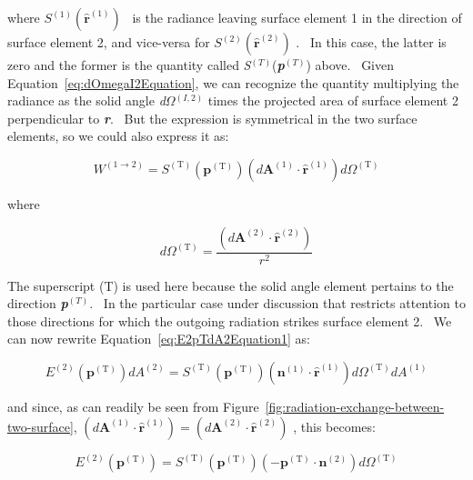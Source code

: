 where \({S^{{\mathrm{(1)}}}}({{\mathbf{\hat r}}^{{\mathrm{(1)}}}})\) ~is the radiance leaving surface element 1 in the direction of surface element 2, and vice-versa for \({S^{{\mathrm{(2)}}}}({{\mathbf{\hat r}}^{{\mathrm{(2)}}}})\) .~ In this case, the latter is zero and the former is the quantity called \emph{S}\(^{(T)}\)(\textbf{\emph{p}}\(^{(T)}\)) above.~ Given Equation~\ref{eq:dOmegaI2Equation}, we can recognize the quantity multiplying the radiance as the solid angle \emph{d}\(\Omega\)\(^{(I,2)}\) times the projected area of surface element 2 perpendicular to \textbf{\emph{r}}.~ But the expression is symmetrical in the two surface elements, so we could also express it as:

\begin{equation}
{W^{(1 \to 2)}} = {S^{{\mathrm{(T)}}}}({{\mathbf{p}}^{{\mathrm{(T)}}}})\left( {d{{\mathbf{A}}^{{\mathrm{(1)}}}} \cdot {{{\mathbf{\hat r}}}^{{\mathrm{(1)}}}}} \right)d{\Omega ^{{\mathrm{(T)}}}}
\end{equation}

where

\begin{equation}
d{\Omega ^{{\mathrm{(T)}}}} = \frac{{\left( {d{{\mathbf{A}}^{{\mathrm{(2)}}}} \cdot {{{\mathbf{\hat r}}}^{{\mathrm{(2)}}}}} \right)}}{{{r^2}}}
\end{equation}

The superscript (T) is used here because the solid angle element pertains to the direction \textbf{\emph{p}}\(^{(T)}\).~ In the particular case under discussion that restricts attention to those directions for which the outgoing radiation strikes surface element 2.~ We can now rewrite Equation~\ref{eq:E2pTdA2Equation1} as:

\begin{equation}
{E^{{\mathrm{(2)}}}}({{\mathbf{p}}^{{\mathrm{(T)}}}})d{A^{{\mathrm{(2)}}}} = {S^{{\mathrm{(T)}}}}({{\mathbf{p}}^{{\mathrm{(T)}}}})\left( {{{\mathbf{n}}^{{\mathrm{(1)}}}} \cdot {{{\mathbf{\hat r}}}^{{\mathrm{(1)}}}}} \right)d{\Omega ^{{\mathrm{(T)}}}}d{A^{{\mathrm{(1)}}}}
\label{eq:E2pTdA2Equation}
\end{equation}

and since, as can readily be seen from Figure~\ref{fig:radiation-exchange-between-two-surface}, \(\left( {d{{\mathbf{A}}^{{\mathrm{(1)}}}} \cdot {{{\mathbf{\hat r}}}^{{\mathrm{(1)}}}}} \right) = \left( {d{{\mathbf{A}}^{{\mathrm{(2)}}}} \cdot {{{\mathbf{\hat r}}}^{{\mathrm{(2)}}}}} \right)\) , this becomes:

\begin{equation}
{E^{{\mathrm{(2)}}}}({{\mathbf{p}}^{{\mathrm{(T)}}}}) = {S^{{\mathrm{(T)}}}}({{\mathbf{p}}^{{\mathrm{(T)}}}})\left( { - {{\mathbf{p}}^{{\mathrm{(T)}}}} \cdot {{\mathbf{n}}^{{\mathrm{(2)}}}}} \right)d{\Omega ^{{\mathrm{(T)}}}}
\end{equation}


